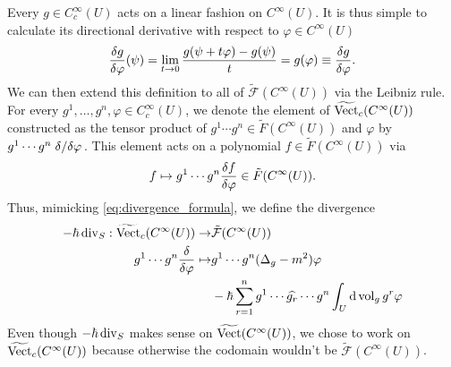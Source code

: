 Every $g\in C^\infty_c(U)$ acts on a linear fashion on $C^\infty(U)$. It is thus simple to calculate its directional derivative with respect to $\varphi\in C^\infty(U)$
\begin{equation}
{\fdv{g}{\varphi}}(\psi)=\lim_{t\rightarrow 0}\frac{g(\psi+t\varphi)-g(\psi)}{t}=g(\varphi)\equiv\fdv{g}{\varphi}.
\end{equation}
We can then extend this definition to all of $\tilde{\mathcal{F}}(C^\infty(U))$ via the Leibniz rule. For every $g^1,\dots,g^n,\varphi\in C^\infty_c(U)$, we denote the element of $\widetilde{\operatorname{Vect}}_c(C^\infty(U))$ constructed as the tensor product of $g^1\cdots g^n\in\tilde{F}(C^\infty(U))$ and $\varphi$ by $g^1\cdots g^n\fdv*{\varphi}$. This element acts on a polynomial $f\in\tilde{F}(C^\infty(U))$ via 
\begin{equation}
f\mapsto g^1\cdots g^n\fdv{f}{\varphi}\in\tilde{F}(C^\infty(U)). 
\end{equation}
Thus, mimicking \eqref{eq:divergence_formula}, we define the divergence
\begin{equation}\label{eq:infinite_divergence}
\begin{aligned}
-\hbar\Div_S:\widetilde{\Vect}_c(C^\infty(U))\rightarrow&\tilde{\mathcal{F}}(C^\infty(U))\\
g^1\cdots g^n\fdv{\varphi}\mapsto&g^1\cdots g^n(\Delta_g-m^2) \varphi \\
&-\hbar\sum_{r=1}^n g^1\cdots \widehat{g_r}\cdots g^n \int_U\dd{\vol_g}g^r\varphi
\end{aligned}
\end{equation}
Even though $-\hbar\operatorname{div}_S$ makes sense on $\widetilde{\operatorname{Vect}}(C^\infty(U))$, we chose to work on $\widetilde{\operatorname{Vect}}_c(C^\infty(U))$ because otherwise the codomain wouldn't be $\tilde{\mathcal{F}}(C^\infty(U))$.

